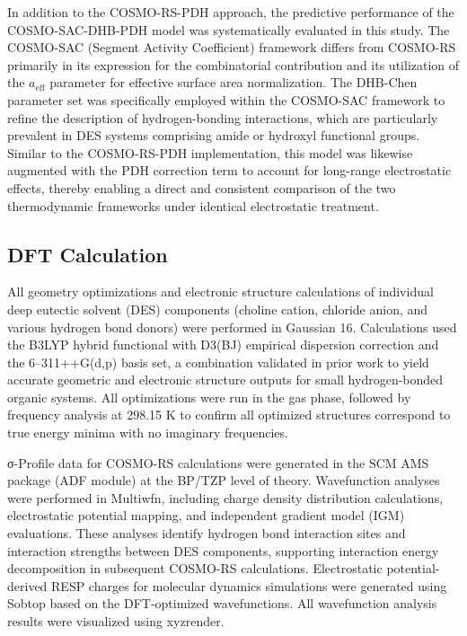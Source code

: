 \documentclass[AMA,LATO2COL]{WileyNJDv5} %
\begin{document}
In addition to the COSMO-RS-PDH approach, the predictive performance of the COSMO-SAC-DHB-PDH model was systematically evaluated in this study. The COSMO-SAC (Segment Activity Coefficient) framework differs from COSMO-RS primarily in its expression for the combinatorial contribution and its utilization of the $a_{\text{eff}}$ parameter for effective surface area normalization. The DHB-Chen parameter set was specifically employed within the COSMO-SAC framework to refine the description of hydrogen-bonding interactions, which are particularly prevalent in DES systems comprising amide or hydroxyl functional groups. Similar to the COSMO-RS-PDH implementation, this model was likewise augmented with the PDH correction term to account for long-range electrostatic effects, thereby enabling a direct and consistent comparison of the two thermodynamic frameworks under identical electrostatic treatment.

\subsection{DFT Calculation}
All geometry optimizations and electronic structure calculations of individual deep eutectic solvent (DES) components (choline cation, chloride anion, and various hydrogen bond donors) were performed in Gaussian 16. Calculations used the B3LYP hybrid functional with D3(BJ) empirical dispersion correction and the 6–311++G(d,p) basis set, a combination validated in prior work to yield accurate geometric and electronic structure outputs for small hydrogen-bonded organic systems. All optimizations were run in the gas phase, followed by frequency analysis at 298.15 K to confirm all optimized structures correspond to true energy minima with no imaginary frequencies.

σ-Profile data for COSMO-RS calculations were generated in the SCM AMS package (ADF module) at the BP/TZP level of theory. Wavefunction analyses were performed in Multiwfn, including charge density distribution calculations, electrostatic potential mapping, and independent gradient model (IGM) evaluations. These analyses identify hydrogen bond interaction sites and interaction strengths between DES components, supporting interaction energy decomposition in subsequent COSMO-RS calculations. Electrostatic potential-derived RESP charges for molecular dynamics simulations were generated using Sobtop based on the DFT-optimized wavefunctions. All wavefunction analysis results were visualized using xyzrender.
\end{document}
